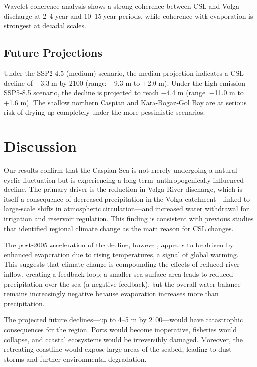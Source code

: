 \documentclass[12pt,a4paper]{article}
\begin{document}
Wavelet coherence analysis shows a strong coherence between CSL and Volga discharge at 2–4 year and 10–15 year periods, while coherence with evaporation is strongest at decadal scales.

\subsection{Future Projections}

Under the SSP2‑4.5 (medium) scenario, the median projection indicates a CSL decline of −3.3 m by 2100 (range: −9.3 m to +2.0 m). Under the high‑emission SSP5‑8.5 scenario, the decline is projected to reach −4.4 m (range: −11.0 m to +1.6 m). The shallow northern Caspian and Kara‑Bogaz‑Gol Bay are at serious risk of drying up completely under the more pessimistic scenarios.

\section{Discussion}

Our results confirm that the Caspian Sea is not merely undergoing a natural cyclic fluctuation but is experiencing a long‑term, anthropogenically influenced decline. The primary driver is the reduction in Volga River discharge, which is itself a consequence of decreased precipitation in the Volga catchment—linked to large‑scale shifts in atmospheric circulation—and increased water withdrawal for irrigation and reservoir regulation. This finding is consistent with previous studies that identified regional climate change as the main reason for CSL changes.

The post‑2005 acceleration of the decline, however, appears to be driven by enhanced evaporation due to rising temperatures, a signal of global warming. This suggests that climate change is compounding the effects of reduced river inflow, creating a feedback loop: a smaller sea surface area leads to reduced precipitation over the sea (a negative feedback), but the overall water balance remains increasingly negative because evaporation increases more than precipitation.

The projected future declines—up to 4–5 m by 2100—would have catastrophic consequences for the region. Ports would become inoperative, fisheries would collapse, and coastal ecosystems would be irreversibly damaged. Moreover, the retreating coastline would expose large areas of the seabed, leading to dust storms and further environmental degradation.
\end{document}
